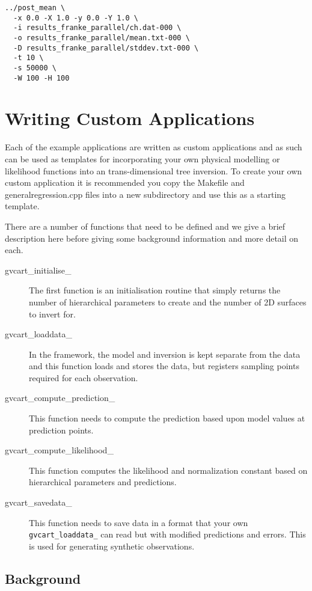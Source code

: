 \documentclass[a4paper,12pt]{article}
\begin{document}
\begin{verbatim}
../post_mean \
  -x 0.0 -X 1.0 -y 0.0 -Y 1.0 \
  -i results_franke_parallel/ch.dat-000 \
  -o results_franke_parallel/mean.txt-000 \
  -D results_franke_parallel/stddev.txt-000 \
  -t 10 \
  -s 50000 \
  -W 100 -H 100
\end{verbatim}

\section{Writing Custom Applications}

Each of the example applications are written as custom applications
and as such can be used as templates for incorporating your own
physical modelling or likelihood functions into an trans-dimensional
tree inversion. To create your own custom application it is recommended you
copy the Makefile and generalregression.cpp files into a new subdirectory
and use this as a starting template.

There are a number of functions that need to be defined and we give
a brief description here before giving some background information and more
detail on each.

\begin{description}
  \item[gvcart\_initialise\_]  The first function is an initialisation routine that simply returns the
number of hierarchical parameters to create and the number of 2D surfaces
to invert for.
\item[gvcart\_loaddata\_] In the framework, the model and inversion is kept separate from the
  data and this function loads and stores the data, but registers sampling points required for
  each observation.
\item[gvcart\_compute\_prediction\_] This function needs to compute the prediction based
  upon model values at prediction points.
\item[gvcart\_compute\_likelihood\_] This function computes the likelihood and normalization
  constant based on hierarchical parameters and predictions.
\item[gvcart\_savedata\_] This function needs to save data in a format that your own \texttt{gvcart\_loaddata\_} can read but with modified predictions and errors. This is used for generating synthetic
  observations.
\end{description}

\subsection{Background}
\end{document}
